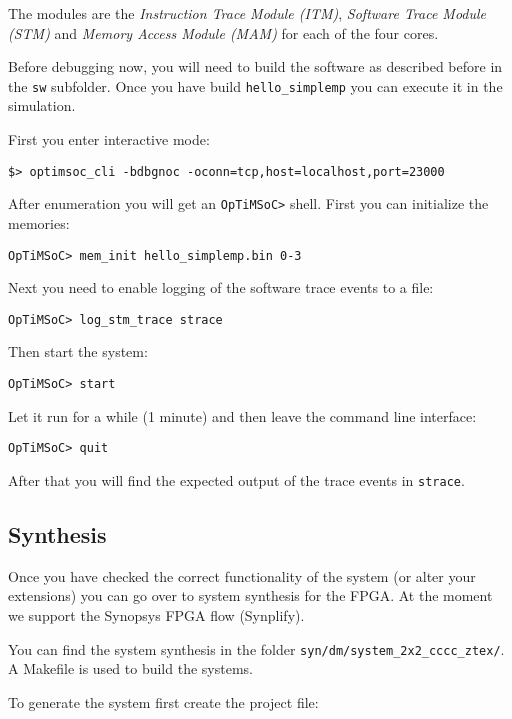 The modules are the \emph{Instruction Trace Module (ITM)},
\emph{Software Trace Module (STM)} and \emph{Memory Access Module
  (MAM)} for each of the four cores.

Before debugging now, you will need to build the software as described
before in the \verb|sw| subfolder. Once you have build
\verb|hello_simplemp| you can execute it in the simulation.

First you enter interactive mode:

\begin{lstlisting}
$> optimsoc_cli -bdbgnoc -oconn=tcp,host=localhost,port=23000
\end{lstlisting}

After enumeration you will get an \verb|OpTiMSoC>| shell. First you
can initialize the memories:

\begin{lstlisting}
OpTiMSoC> mem_init hello_simplemp.bin 0-3
\end{lstlisting}

Next you need to enable logging of the software trace events to a
file:

\begin{lstlisting}
OpTiMSoC> log_stm_trace strace
\end{lstlisting}

Then start the system:
\begin{lstlisting}
OpTiMSoC> start
\end{lstlisting}

Let it run for a while (1 minute) and then leave the command line
interface:
\begin{lstlisting}
OpTiMSoC> quit
\end{lstlisting}

After that you will find the expected output of the trace events in
\verb|strace|.

\subsection{Synthesis}

Once you have checked the correct functionality of the system (or
alter your extensions) you can go over to system synthesis for the
FPGA. At the moment we support the Synopsys FPGA flow (Synplify).

You can find the system synthesis in the folder
\verb|syn/dm/system_2x2_cccc_ztex/|. A Makefile is used to build the
systems.

To generate the system first create the project file:

